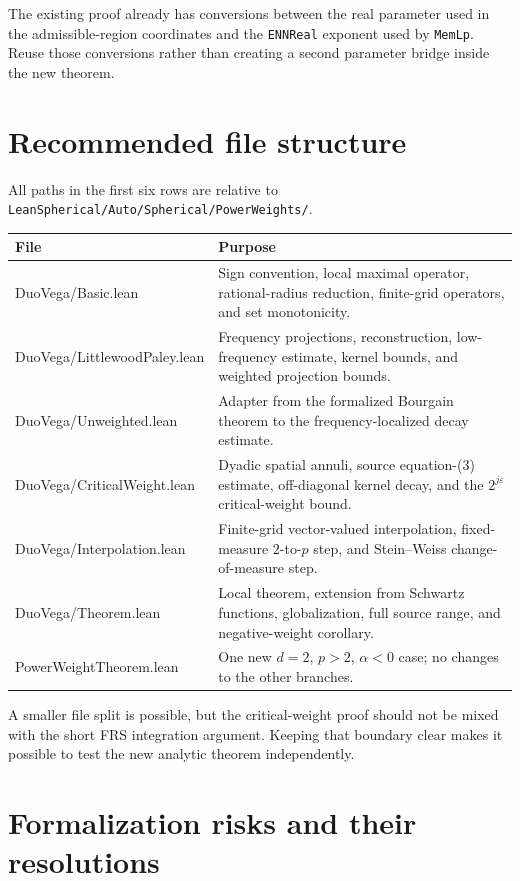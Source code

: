 \documentclass[11pt,a4paper]{article}
\theoremstyle{definition}
\theoremstyle{remark}
\newcommand{\lean}{\texttt}
\begin{document}
The existing proof already has conversions between the real parameter used in
the admissible-region coordinates and the \lean{ENNReal} exponent used by
\lean{MemLp}.  Reuse those conversions rather than creating a second parameter
bridge inside the new theorem.

\section{Recommended file structure}

All paths in the first six rows are relative to
\lean{LeanSpherical/Auto/Spherical/PowerWeights/}.

\begin{longtable}{>{\raggedright\arraybackslash\ttfamily}p{}p{}}
\toprule
\normalfont File & Purpose \\
\midrule
\endhead
DuoVega/Basic.lean &
Sign convention, local maximal operator, rational-radius reduction, finite-grid
operators, and set monotonicity. \\
\addlinespace
DuoVega/LittlewoodPaley.lean &
Frequency projections, reconstruction, low-frequency estimate, kernel bounds,
and weighted projection bounds. \\
\addlinespace
DuoVega/Unweighted.lean &
Adapter from the formalized Bourgain theorem to the frequency-localized decay
estimate. \\
\addlinespace
DuoVega/CriticalWeight.lean &
Dyadic spatial annuli, source equation-(3) estimate, off-diagonal kernel decay,
and the $2^{j\varepsilon}$ critical-weight bound. \\
\addlinespace
DuoVega/Interpolation.lean &
Finite-grid vector-valued interpolation, fixed-measure $2$-to-$p$ step, and
Stein--Weiss change-of-measure step. \\
\addlinespace
DuoVega/Theorem.lean &
Local theorem, extension from Schwartz functions, globalization, full source
range, and negative-weight corollary. \\
\addlinespace
PowerWeightTheorem.lean &
One new $d=2$, $p>2$, $\alpha<0$ case; no changes to the other branches. \\
\bottomrule
\end{longtable}

A smaller file split is possible, but the critical-weight proof should not be
mixed with the short FRS integration argument.  Keeping that boundary clear
makes it possible to test the new analytic theorem independently.

\section{Formalization risks and their resolutions}
\end{document}
